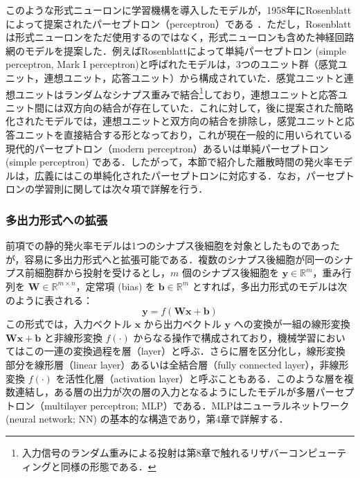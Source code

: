\documentclass[titlepage]{ltjsbook}
\begin{document}
このような形式ニューロンに学習機構を導入したモデルが，1958年にRosenblattによって提案されたパーセプトロン（perceptron）である \citep{rosenblatt1958perceptron}．ただし，Rosenblattは形式ニューロンをただ使用するのではなく，形式ニューロンも含めた神経回路網のモデルを提案した．例えばRosenblattによって単純パーセプトロン (simple perceptron, Mark I perceptron)と呼ばれたモデルは，3つのユニット群（感覚ユニット，連想ユニット，応答ユニット）から構成されていた．感覚ユニットと連想ユニットはランダムなシナプス重みで結合\footnote{入力信号のランダム重みによる投射は第8章で触れるリザバーコンピューティングと同様の形態である．}しており，連想ユニットと応答ユニット間には双方向の結合が存在していた．これに対して，後に提案された簡略化されたモデルでは，連想ユニットと双方向の結合を排除し，感覚ユニットと応答ユニットを直接結合する形となっており，これが現在一般的に用いられている現代的パーセプトロン（modern perceptron）あるいは単純パーセプトロン (simple perceptron) である．したがって，本節で紹介した離散時間の発火率モデルは，広義にはこの単純化されたパーセプトロンに対応する．なお，パーセプトロンの学習則に関しては次々項で詳解を行う．

\subsubsection{多出力形式への拡張}
前項での静的発火率モデルは1つのシナプス後細胞を対象としたものであったが，容易に多出力形式へと拡張可能である．複数のシナプス後細胞が同一のシナプス前細胞群から投射を受けるとし，$m$ 個のシナプス後細胞を $\mathbf{y} \in \mathbb{R}^m$，重み行列を $\mathbf{W} \in \mathbb{R}^{m \times n}$，定常項 (bias) を $\mathbf{b} \in \mathbb{R}^m$ とすれば，多出力形式のモデルは次のように表される：
\begin{equation}
\mathbf{y} = f(\mathbf{W} \mathbf{x} + \mathbf{b})
\end{equation}
この形式では，入力ベクトル $\mathbf{x}$ から出力ベクトル $\mathbf{y}$ への変換が一組の線形変換 $\mathbf{W}\mathbf{x} + \mathbf{b}$ と非線形変換 $f(\cdot)$ からなる操作で構成されており，機械学習においてはこの一連の変換過程を層（layer）と呼ぶ．さらに層を区分化し，線形変換部分を線形層（linear layer）あるいは全結合層（fully connected layer），非線形変換 $f(\cdot)$ を活性化層（activation layer）と呼ぶこともある．このような層を複数連結し，ある層の出力が次の層の入力となるようにしたモデルが多層パーセプトロン（multilayer perceptron; MLP）である．MLPはニューラルネットワーク (neural network; NN) の基本的な構造であり，第4章で詳解する．
\end{document}
